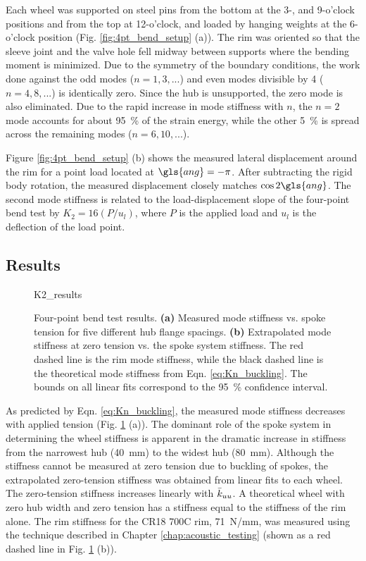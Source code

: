 \documentclass[\rootdir/thesis.tex]{subfiles}
\begin{document}
Each wheel was supported on steel pins from the bottom at the 3-, and 9-o'clock positions and from the top at 12-o'clock, and loaded by hanging weights at the 6-o'clock position (Fig. \ref{fig:4pt_bend_setup} (a)). The rim was oriented so that the sleeve joint and the valve hole fell midway between supports where the bending moment is minimized. Due to the symmetry of the boundary conditions, the work done against the odd modes ($n=1, 3, ...$) and even modes divisible by 4 ($n=4, 8, ...$) is identically zero. Since the hub is unsupported, the zero mode is also eliminated. Due to the rapid increase in mode stiffness with $n$, the $n=2$ mode accounts for about \SI{95}{\percent} of the strain energy, while the other \SI{5}{\percent} is spread across the remaining modes ($n=6, 10, ...$).

Figure \ref{fig:4pt_bend_setup} (b) shows the measured lateral displacement around the rim for a point load located at $\gls{ang}=-\pi$. After subtracting the rigid body rotation, the measured displacement closely matches $\cos{2\gls{ang}}$. The second mode stiffness is related to the load-displacement slope of the four-point bend test by $K_2 = 16(P/u_l)$, where $P$ is the applied load and $u_l$ is the deflection of the load point.

\subsection{Results}
\label{sec:K2_T_results}

\begin{figure}[t]
\centering
{K2_results}
\caption{Four-point bend test results. \textbf{(a)} Measured mode stiffness vs. spoke tension for five different hub flange spacings. \textbf{(b)} Extrapolated mode stiffness at zero tension vs. the spoke system stiffness. The red dashed line is the rim mode stiffness, while the black dashed line is the theoretical mode stiffness from Eqn. \eqref{eq:Kn_buckling}. The bounds on all linear fits correspond to the \SI{95}{\percent} confidence interval.}
\label{fig:K2_results}
\end{figure}

As predicted by Eqn. \eqref{eq:Kn_buckling}, the measured mode stiffness decreases with applied tension (Fig. \ref{fig:K2_results} (a)). The dominant role of the spoke system in determining the wheel stiffness is apparent in the dramatic increase in stiffness from the narrowest hub (\SI{40}{mm}) to the widest hub (\SI{80}{mm}). Although the stiffness cannot be measured at zero tension due to buckling of spokes, the extrapolated zero-tension stiffness was obtained from linear fits to each wheel. The zero-tension stiffness increases linearly with $\bar{k}_{uu}$. A theoretical wheel with zero hub width and zero tension has a stiffness equal to the stiffness of the rim alone. The rim stiffness for the CR18 700C rim, \SI{71}{N/mm}, was measured using the technique described in Chapter \ref{chap:acoustic_testing} (shown as a red dashed line in Fig. \ref{fig:K2_results} (b)).
\end{document}
